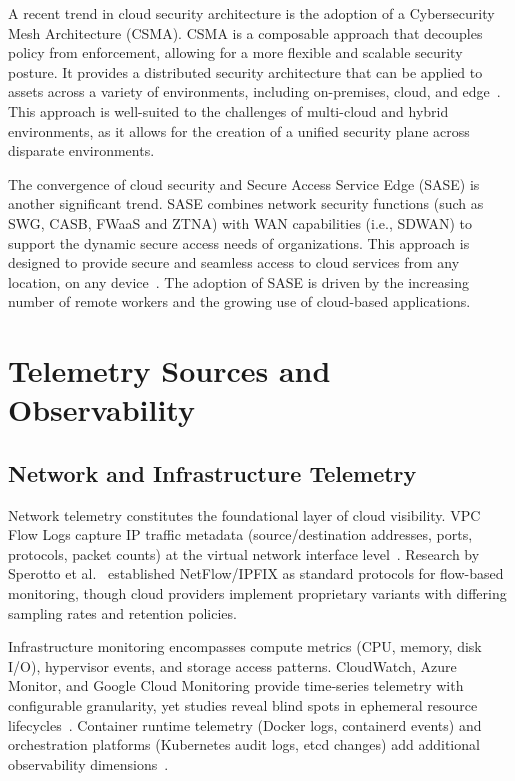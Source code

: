 A recent trend in cloud security architecture is the adoption of a Cybersecurity Mesh Architecture (CSMA). CSMA is a composable approach that decouples policy from enforcement, allowing for a more flexible and scalable security posture. It provides a distributed security architecture that can be applied to assets across a variety of environments, including on-premises, cloud, and edge~\cite{eviden2024trends}. This approach is well-suited to the challenges of multi-cloud and hybrid environments, as it allows for the creation of a unified security plane across disparate environments.

The convergence of cloud security and Secure Access Service Edge (SASE) is another significant trend. SASE combines network security functions (such as SWG, CASB, FWaaS and ZTNA) with WAN capabilities (i.e., SDWAN) to support the dynamic secure access needs of organizations. This approach is designed to provide secure and seamless access to cloud services from any location, on any device~\cite{cloudwize2024sase}. The adoption of SASE is driven by the increasing number of remote workers and the growing use of cloud-based applications.

\section{Telemetry Sources and Observability}\label{sec:lit-telemetry}
\subsection{Network and Infrastructure Telemetry}
Network telemetry constitutes the foundational layer of cloud visibility. VPC Flow Logs capture IP traffic metadata (source/destination addresses, ports, protocols, packet counts) at the virtual network interface level~\cite{awscloudtrail2023}. Research by Sperotto et al.~\cite{sperotto2010netflow} established NetFlow/IPFIX as standard protocols for flow-based monitoring, though cloud providers implement proprietary variants with differing sampling rates and retention policies.

Infrastructure monitoring encompasses compute metrics (CPU, memory, disk I/O), hypervisor events, and storage access patterns. CloudWatch, Azure Monitor, and Google Cloud Monitoring provide time-series telemetry with configurable granularity, yet studies reveal blind spots in ephemeral resource lifecycles~\cite{lee2018cloudmonitoring}. Container runtime telemetry (Docker logs, containerd events) and orchestration platforms (Kubernetes audit logs, etcd changes) add additional observability dimensions~\cite{burns2019kubernetes}.

